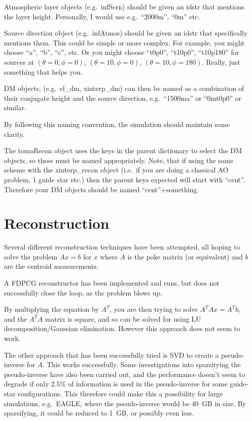 \documentclass{article}
\begin{document}
Atmospheric layer objects (e.g.\ infScrn) should be given an idstr
that mentions the layer height.  Personally, I would use e.g.\
``2000m'', ``0m'' etc.

Source direction object (e.g.\ infAtmos) should be given an idstr that
specifically mentions them.  This could be simple or more complex.
For example, you might choose ``a'', ``b'', ``c'', etc.  Or you might
choose ``t0p0'', ``t10p0'', ``t10p180'' for sources at $(\theta=0,
\phi=0)$, $(\theta=10, \phi=0)$, $(\theta=10, \phi=180)$.  Really,
just something that helps you.

DM objects, (e.g.\ el\_dm, xinterp\_dm) can then be named as a
combination of their conjugate height and the source direction, e.g.\
``1500ma'' or ``0mt0p0'' or similar.

By following this naming convention, the simulation should maintain
some clarity.

The tomoRecon object uses the keys in the parent dictionary to select
the DM objects, so these must be named appropriately.  Note, that if
using the same scheme with the xinterp\_recon object (i.e.\ if you are
doing a classical AO problem, 1 guide star etc.) then the parent keys
expected will start with ``cent''.  Therefore your DM objects should
be named ``cent''+something.

\section{Reconstruction}

Several different reconstruction techniques have been attempted, all
hoping to solve the problem $Ax=b$ for $x$ where $A$ is the poke
matrix (or equivalent) and $b$ are the centroid measurements.  

A FDPCG reconstructor has been implemented and runs, but does not
successfully close the loop, as the problem blows up.

By multiplying the equation by $A^T$, you are then trying to solve
$A^TAx=A^Tb$, and the $A^TA$ matrix is square, and so can be solved
for using LU decomposition/Gaussian elimination.  However this
approach does not seem to work.

The other approach that has been successfully tried is SVD to create a
pseudo-inverse for $A$.  This works successfully.  Some investigations
into sparsitying the pseudo-inverse have also been carried out, and
the performance doesn't seem to degrade if only $2.5\%$ of information
is used in the pseudo-inverse for some guide-star configurations.
This therefore could make this a possibility for large simulations,
e.g.\ EAGLE, where the pseudo-inverse would be 40~GB in size.  By
sparsifying, it could be reduced to 1~GB, or possibly even less.  
\end{document}
